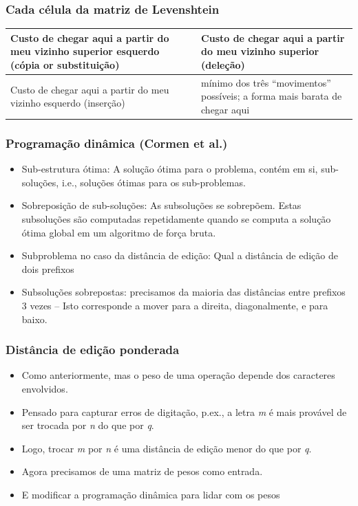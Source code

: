 \documentclass[compress]{beamer}
\begin{document}
\begin{frame}
\frametitle{Cada célula da matriz de Levenshtein}

\bigskip

\begin{tabular}{|l|l|}

\hline
\parbox{4cm}{Custo de chegar aqui a partir do meu vizinho superior 
esquerdo (cópia or substituição)} &
\parbox{4cm}{Custo de chegar aqui a partir do meu vizinho superior 
(deleção)}\\\hline
\parbox{4cm}{Custo de chegar aqui a partir do meu vizinho esquerdo (inserção)} &
\parbox{4cm}{mínimo dos três ``movimentos'' possíveis; a forma mais barata de 
chegar aqui
} \\\hline

\end{tabular}

\end{frame}



\begin{frame}[<+->]
\frametitle{Programação dinâmica (Cormen et al.)}
\pause[2]

\begin{itemize}
\item Sub-estrutura ótima: A solução ótima para o problema, contém em si, 
{\color{blue} sub-soluções}, i.e., soluções ótimas para os 
sub-problemas.
\item Sobreposição de sub-soluções: As subsoluções se sobrepõem. Estas 
subsoluções são computadas repetidamente quando se computa a solução ótima 
global em um algoritmo de força bruta.
\item Subproblema no caso da distância de edição: Qual a distância de edição de 
dois prefixos
\item Subsoluções sobrepostas: precisamos da maioria das distâncias entre 
prefixos 3 vezes -- Isto corresponde a mover para a direita, diagonalmente, 
e para baixo.
\end{itemize}

\end{frame}

\begin{frame}[<+->]
\frametitle{Distância de edição ponderada}
\pause[2]
\begin{itemize}
\item Como anteriormente, mas o peso de uma operação depende dos caracteres 
envolvidos.
\item Pensado para capturar erros de digitação, p.ex., a letra \emph{m} é mais 
provável de ser trocada por \emph{n} do que por \emph{q}.
\item Logo, trocar \emph{m} por \emph{n} é uma distância de edição menor do que 
por \emph{q}.
\item Agora precisamos de uma matriz de pesos como entrada.
\item E modificar a programação dinâmica para lidar com os pesos
\end{itemize}
\end{frame}
\end{document}
